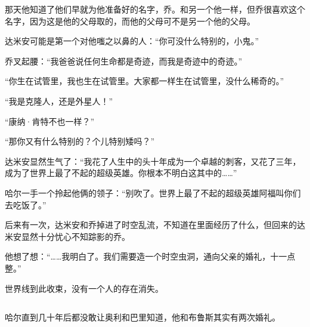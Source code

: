 \documentclass[../main]{subfiles}
\begin{document}
那天他知道了他们早就为他准备好的名字，乔。和另一个他一样，但乔很喜欢这个名字，因为这是他的父母取的，而他的父母可不是另一个他的父母。

达米安可能是第一个对他嗤之以鼻的人：“你可没什么特别的，小鬼。”

乔叉起腰：“我爸爸说任何生命都是奇迹，而我是奇迹中的奇迹。”

“你生在试管里，我也生在试管里。大家都一样生在试管里，没什么稀奇的。”

“我是克隆人，还是外星人！”

“康纳·肯特不也一样？”

“那你又有什么特别的？个儿特别矮吗？”

达米安显然生气了：“我花了人生中的头十年成为一个卓越的刺客，又花了三年，成为了世界上最了不起的超级英雄。你根本不明白这其中的……”

哈尔一手一个拎起他俩的领子：“别吹了。世界上最了不起的超级英雄阿福叫你们去吃饭了。”

后来有一次，达米安和乔掉进了时空乱流，不知道在里面经历了什么，但回来的达米安显然十分忧心不知踪影的乔。

他想了想：“……我明白了。我们需要造一个时空虫洞，通向父亲的婚礼，十一点整。”

世界线到此收束，没有一个人的存在消失。


\subsection{}

哈尔直到几十年后都没敢让奥利和巴里知道，他和布鲁斯其实有两次婚礼。

\storyend[全文完]

\end{document}
